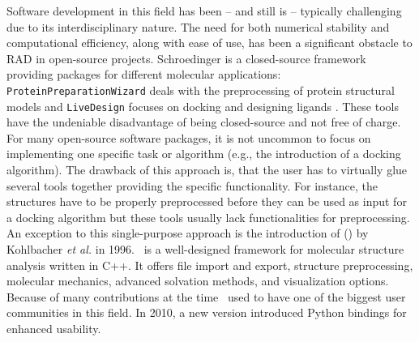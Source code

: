 Software development in this field has been -- and still is -- typically challenging due to its interdisciplinary nature. The need for both numerical stability and computational efficiency, along with ease of use, has been a significant obstacle to RAD in open-source projects. 
Schroedinger is a closed-source framework providing packages for different molecular applications: \texttt{ProteinPreparationWizard} deals with the preprocessing of protein structural models and \texttt{LiveDesign} focuses on docking and designing ligands \cite{SchrödingerPPW, SchrödingerLiveDesign}. These tools have the undeniable disadvantage of being closed-source and not free of charge. \\
For many open-source software packages, it is not uncommon to focus on implementing one specific task or algorithm (e.g., the introduction of a docking algorithm). The drawback of this approach is, that the user has to virtually glue several tools together providing the specific functionality. For instance, the structures have to be properly preprocessed before they can be used as input for a docking algorithm but these tools usually lack functionalities for preprocessing.  \\
An exception to this single-purpose approach is the introduction of \ballFull (\ball) by Kohlbacher \textit{et al.} in 1996. \ball\ is a well-designed framework for molecular structure analysis written in C++. It offers file import and export, structure preprocessing, molecular mechanics, advanced solvation methods, and visualization options. Because of many contributions at the time \ball\ used to have one of the biggest user communities in this field. In 2010, a new version introduced Python bindings for enhanced usability.\\

